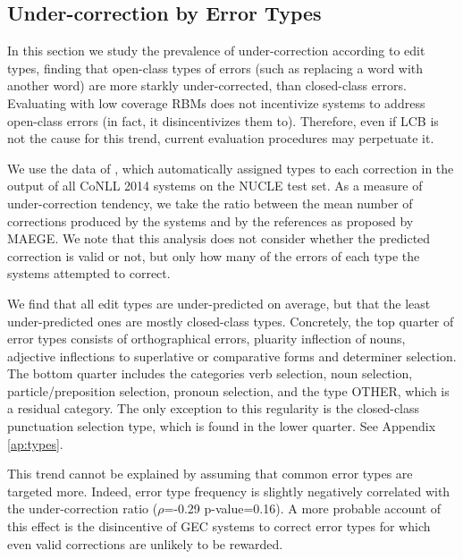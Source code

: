 \documentclass[a4paper]{article}
\begin{document}
\subsection{Under-correction by Error Types}\label{subsec:by_types}

In this section we study the prevalence of under-correction according to edit types, finding that open-class types of errors
(such as replacing a word with another word) are more starkly under-corrected, than closed-class errors.
Evaluating with low coverage RBMs does not incentivize systems to address open-class errors (in fact, it disincentivizes them to). Therefore, even if LCB is not the cause for this trend, current evaluation procedures may perpetuate it.

We use the data of \citet{bryant-felice-briscoe:2017:Long}, which automatically assigned types to each correction in the output of all CoNLL 2014 
systems on the NUCLE test set.
As a measure of under-correction tendency, we take the ratio between the mean number of corrections produced by the systems and by the references as proposed by {\sc MAEGE}\cite{choshen2018maege}. 
We note that this analysis does not consider whether the predicted correction is valid or not, but only how many of the errors of each type the systems attempted to correct. 

We find that all edit types are under-predicted on average, but that the least under-predicted ones are mostly closed-class types. 
Concretely, the top quarter of error types consists of orthographical errors, 
pluarity inflection of nouns, 
adjective inflections to superlative or comparative forms and determiner selection. The bottom quarter includes the categories 
verb selection, noun selection, particle/preposition selection, pronoun selection, and the type {\sc OTHER}, which is a residual category.
The only exception to this regularity is the closed-class punctuation selection type, which is found in the lower quarter. See Appendix \ref{ap:types}.

This trend cannot be explained by assuming that common error types are targeted more.
Indeed, error type frequency is slightly negatively correlated with the under-correction ratio ($\rho$=-0.29 p-value=0.16).
A more probable account of this effect is the disincentive of GEC systems to correct error types for which even valid
corrections are unlikely to be rewarded.

\end{document}
